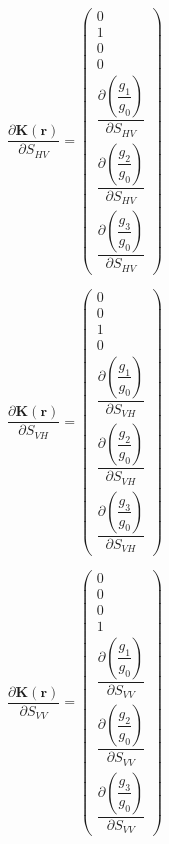 \documentclass[12pt,a4paper]{jsreport}
\begin{document}
  \begin{equation}
    \frac{\partial \bm{K({\bm{r}})}}{\partial S_{HV}} 
    = \begin{pmatrix} 0 \\ 1 \\ 0 \\ 0 \\  \dfrac{\partial (\dfrac{g_{1}}{g_{0}})}{\partial S_{HV}}  \\  \dfrac{\partial (\dfrac{g_{2}}{g_{0}})}{\partial S_{HV}} \\  \dfrac{\partial (\dfrac{g_{3}}{g_{0}})}{\partial S_{HV}} \end{pmatrix}
    \label{polarimetricdiffSHV}
    \end{equation}
  
  
    \begin{equation}
      \frac{\partial \bm{K({\bm{r}})}}{\partial S_{VH}} 
      = \begin{pmatrix} 0 \\ 0 \\ 1 \\ 0 \\  \dfrac{\partial (\dfrac{g_{1}}{g_{0}})}{\partial S_{VH}}  \\  \dfrac{\partial (\dfrac{g_{2}}{g_{0}})}{\partial S_{VH}} \\  \dfrac{\partial (\dfrac{g_{3}}{g_{0}})}{\partial S_{VH}} \end{pmatrix}
      \label{polarimetricdiffSVH}
      \end{equation}
  
    \begin{equation}
      \frac{\partial \bm{K({\bm{r}})}}{\partial S_{VV}} 
      = \begin{pmatrix} 0 \\ 0 \\ 0 \\ 1 \\  \dfrac{\partial (\dfrac{g_{1}}{g_{0}})}{\partial S_{VV}}  \\  \dfrac{\partial (\dfrac{g_{2}}{g_{0}})}{\partial S_{VV}} \\  \dfrac{\partial (\dfrac{g_{3}}{g_{0}})}{\partial S_{VV}} \end{pmatrix}
      \label{polarimetricdiffSVV}
      \end{equation}


\clearpage
\end{document}
